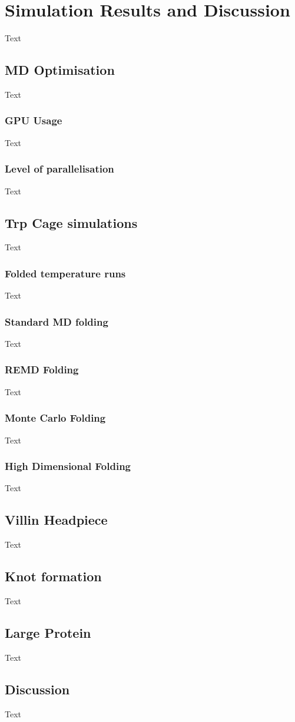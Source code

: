 \chapter{Simulation Results and Discussion}
Text


\section{MD Optimisation}
Text
\subsection{GPU Usage}
Text
\subsection{Level of parallelisation}
Text

\section{Trp Cage simulations}
Text
\subsection{Folded temperature runs}
Text
\subsection{Standard MD folding}
Text
\subsection{REMD Folding}
Text
\subsection{Monte Carlo Folding}
Text
\subsection{High Dimensional Folding}
Text
 
\section{Villin Headpiece}
Text

\section{Knot formation}
Text

\section{Large Protein}
Text

\section{Discussion}
Text
\newpage